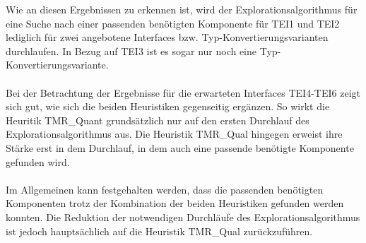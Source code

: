 \begin{multicols}{3}
\columnbreak
{}\columnbreak
{}
\end{multicols}

\begin{multicols}{3}
\columnbreak
{}\columnbreak
{}
\end{multicols}
\noindent
Wie an diesen Ergebnissen zu erkennen ist, wird der Explorationsalgorithmus für eine Suche nach einer passenden benötigten Komponente für TEI1 und TEI2 lediglich für zwei angebotene Interfaces bzw. Typ-Konvertierungsvarianten durchlaufen. In Bezug auf TEI3 ist es sogar nur noch eine Typ-Konvertierungsvariante.\\\\
Bei der Betrachtung der Ergebnisse für die erwarteten Interfaces TEI4-TEI6 zeigt sich gut, wie sich die beiden Heuristiken gegenseitig ergänzen. So wirkt die Heuritik TMR\_Quant grundsätzlich nur auf den ersten Durchlauf des Explorationsalgorithmus aus. Die Heuristik TMR\_Qual hingegen erweist ihre Stärke erst in dem Durchlauf, in dem auch eine passende benötigte Komponente gefunden wird.\\\\
Im Allgemeinen kann festgehalten werden, dass die passenden benötigten Komponenten trotz der Kombination der beiden Heuristiken gefunden werden konnten. Die Reduktion der notwendigen Durchläufe des Explorationsalgorithmus ist jedoch hauptsächlich auf die Heuristik TMR\_Qual zurückzuführen. 